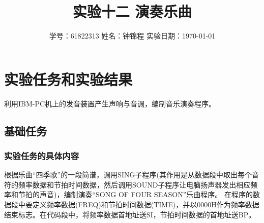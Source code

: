 \documentclass[12pt, a4paper, oneside]{ctexart}
\title{实验十二 \qquad  演奏乐曲}
\author{学号：61822313 \qquad 姓名：钟锦程 \qquad 实验日期：\today}
\date{}
\begin{document}
\maketitle
\section{实验任务和实验结果}
利用IBM-PC机上的发音装置产生声响与音调，编制音乐演奏程序。
\subsection{基础任务}
\subsubsection{实验任务的具体内容}
根据乐曲“四季歌”的一段简谱，调用SING子程序(其作用是从数据段中取出每个音符的频率数据和节拍时间数据，然后调用SOUND子程序让电脑扬声器发出相应频率和节拍的声音)，编制演奏“SONG OF FOUR SEASON”乐曲程序。
在程序的数据段中要定义频率数据(FREQ)和节拍时间数据(TIME)，并以0000H作为频率数据结束标志。在代码段中，将频率数据首地址送SI，节拍时间数据的首地址送BP。
\end{document}
